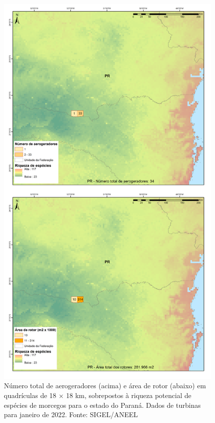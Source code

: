 \documentclass[
  oneside]{scrbook}
\begin{document}
\begin{figure}[H]

{\centering \includegraphics[width=0.7\linewidth]{imagens/cap09/Figura_9.15} 

}

\caption{Número total de aerogeradores (acima) e área de rotor (abaixo) em quadrículas de 18 × 18 km, sobrepostos à riqueza potencial de espécies de morcegos para o estado do Paraná. Dados de turbinas para janeiro de 2022. Fonte: SIGEL/ANEEL}\label{fig:80}
\end{figure}
\end{document}
